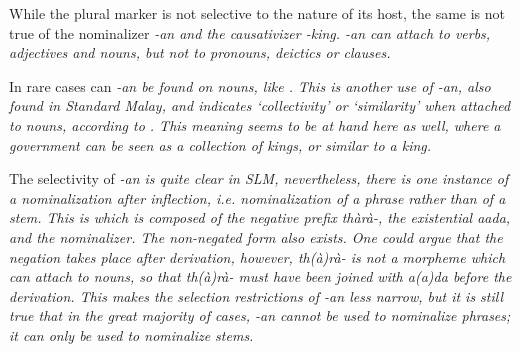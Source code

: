 \documentclass[a4paper]{article}
\begin{document}

While the plural marker is not selective to the nature of its host, the same is not true of the nominalizer \em -an \em and the causativizer \em -king\em. \em -an \em can attach to verbs, adjectives and nouns, but not to pronouns, deictics or clauses.





In rare cases can \em -an \em be found on nouns, like . This is another use of \em -an\em, also found in Standard Malay, and indicates `collectivity' or `similarity'  when attached to nouns, according to \citet[193]{Adelaar1985}. This meaning seems to be at hand here as well, where a government can be seen as a collection of kings, or similar to a king.

The selectivity of \em -an \em is quite clear in SLM, nevertheless, there is one instance of a nominalization after inflection, i.e. nominalization of a phrase rather than of a stem. This is  which is composed of the negative prefix \em thàrà-\em, the existential \em aada, \em and the nominalizer. The non-negated form  also exists. One could argue that the negation takes place after derivation, however, \em th(à)rà- \em is not a morpheme which can attach to nouns, so that  \em th(à)rà- \em must have been joined with \em a(a)da \em before the derivation. This makes the selection restrictions of \em -an \em less narrow, but it is still true that in the great majority of cases, \em -an \em cannot be used to nominalize phrases; it can only be used to nominalize stems.
\end{document}
